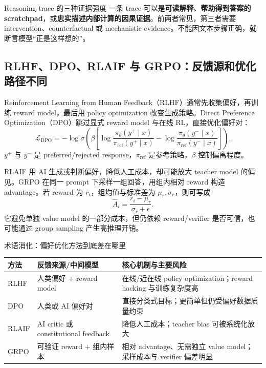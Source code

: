 \begin{warningbox}{Reasoning trace 的三种证据强度}
一条 trace 可以是\textbf{可读解释}、\textbf{帮助得到答案的 scratchpad}，或\textbf{忠实描述内部计算的因果证据}。前两者常见，第三者需要 intervention、counterfactual 或 mechanistic evidence。不能因文本步骤正确，就断言模型“正是这样想的”。
\end{warningbox}

\subsection{RLHF、DPO、RLAIF 与 GRPO：反馈源和优化路径不同}

Reinforcement Learning from Human Feedback（RLHF）通常先收集偏好，再训练 reward model，最后用 policy optimization 改变生成策略。Direct Preference Optimization（DPO）跳过显式 reward model 与在线 RL，直接优化偏好对：
\[
\mathcal{L}_{\mathrm{DPO}}
=-\log\sigma\!\left(\beta\left[
\log\frac{\pi_{\theta}(y^+\mid x)}{\pi_{\mathrm{ref}}(y^+\mid x)}
-\log\frac{\pi_{\theta}(y^-\mid x)}{\pi_{\mathrm{ref}}(y^-\mid x)}
\right]\right).
\]
$y^+$ 与 $y^-$ 是 preferred/rejected response，$\pi_{\mathrm{ref}}$ 是参考策略，$\beta$ 控制偏离程度。



RLAIF 用 AI 生成或判断偏好，降低人工成本，却可能放大 teacher model 的偏见。GRPO 在同一 prompt 下采样一组回答，用组内相对 reward 构造 advantage。若 reward 为 $r_i$，组均值与标准差为 $\mu_r,\sigma_r$，则可写成
\[
\hat{A}_i=\frac{r_i-\mu_r}{\sigma_r+\epsilon}.
\]
它避免单独 value model 的一部分成本，但仍依赖 reward/verifier 是否可信，也可能通过 group sampling 产生高推理开销。



\begin{knowledgebox}{术语消化：偏好优化方法到底差在哪里}
\begin{tabularx}{\textwidth}{p{}p{}X}
\toprule
方法 & 反馈来源/中间模型 & 核心机制与主要风险 \\
\midrule
RLHF & 人类偏好 + reward model & 在线/近在线 policy optimization；reward hacking 与训练复杂度高 \\
DPO & 人类或 AI 偏好对 & 直接分类式目标；更简单但仍受偏好数据质量约束 \\
RLAIF & AI critic 或 constitutional feedback & 降低人工成本；teacher bias 可被系统化放大 \\
GRPO & 可验证 reward + 组内样本 & 相对 advantage、无需独立 value model；采样成本与 verifier 偏差明显 \\
\bottomrule
\end{tabularx}
\end{knowledgebox}

